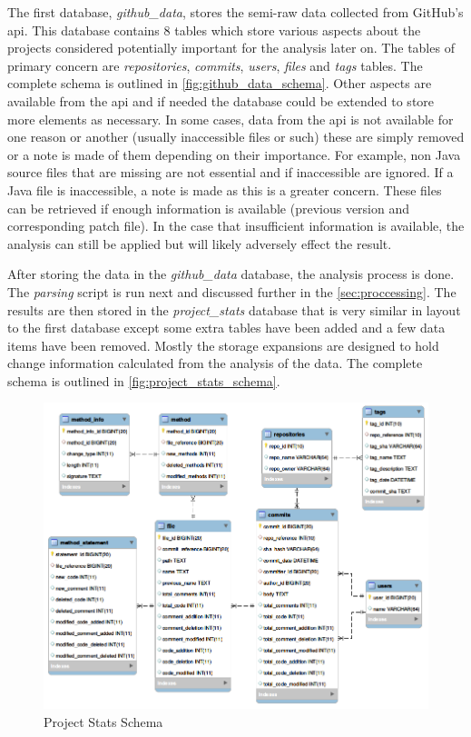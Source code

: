 The first database, \textit{github\_data}, stores the semi-raw data collected from GitHub's \gls{api}. This database contains 8 tables which store various aspects about the projects considered potentially important for the analysis later on. The tables of primary concern are \textit{repositories}, \textit{commits}, \textit{users}, \textit{files} and \textit{tags} tables. The complete schema is outlined in \autoref{fig:github_data_schema}. Other aspects are available from the \gls{api} and if needed the database could be extended to store more elements as necessary. In some cases, data from the \gls{api} is not available for one reason or another (usually inaccessible files or such) these are simply removed or a note is made of them depending on their importance. For example, non Java source files that are missing are not essential and if inaccessible are ignored. If a Java file is inaccessible, a note is made as this is a greater concern. These files can be retrieved if enough information is available (previous version and corresponding patch file). In the case that insufficient information is available, the analysis can still be applied but will likely adversely effect the result.

After storing the data in the \textit{github\_data} database, the analysis process is done. The \textit{parsing} script is run next and discussed further in the \autoref{sec:proccessing}. The results are then stored in the \textit{project\_stats} database that is very similar in layout to the first database except some extra tables have been added and a few data items have been removed. Mostly the storage expansions are designed to hold change information calculated from the analysis of the data. The complete schema is outlined in \autoref{fig:project_stats_schema}.

\begin{figure}[!ht]
    \centering
        \includegraphics[width=1.0\textwidth]{images/project_stats_schema}
    \caption{Project Stats Schema}
    \label{fig:project_stats_schema}
\end{figure}

